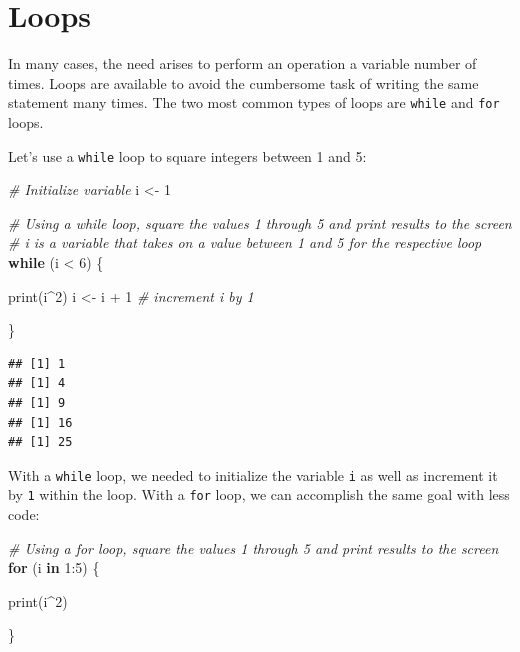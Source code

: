 \documentclass[
]{book}
\newenvironment{Shaded}{\begin{snugshade}}{\end{snugshade}}
\newcommand{\CommentTok}[1]{\textcolor[rgb]{0.56,0.35,0.01}{\textit{#1}}}
\newcommand{\ControlFlowTok}[1]{\textcolor[rgb]{0.13,0.29,0.53}{\textbf{#1}}}
\newcommand{\DecValTok}[1]{\textcolor[rgb]{0.00,0.00,0.81}{#1}}
\newcommand{\FunctionTok}[1]{\textcolor[rgb]{0.00,0.00,0.00}{#1}}
\newcommand{\NormalTok}[1]{#1}
\newcommand{\OtherTok}[1]{\textcolor[rgb]{0.56,0.35,0.01}{#1}}
\newcommand{\SpecialCharTok}[1]{\textcolor[rgb]{0.00,0.00,0.00}{#1}}
\begin{document}
\hypertarget{loops}{%
\section{Loops}\label{loops}}

In many cases, the need arises to perform an operation a variable number of times. Loops are available to avoid the cumbersome task of writing the same statement many times. The two most common types of loops are \texttt{while} and \texttt{for} loops.

Let's use a \texttt{while} loop to square integers between 1 and 5:

\begin{Shaded}
\begin{Highlighting}[]
\CommentTok{\# Initialize variable}
\NormalTok{i }\OtherTok{\textless{}{-}} \DecValTok{1}

\CommentTok{\# Using a \textquotesingle{}while\textquotesingle{} loop, square the values 1 through 5 and print results to the screen}
\CommentTok{\# \textquotesingle{}i\textquotesingle{} is a variable that takes on a value between 1 and 5 for the respective loop}
\ControlFlowTok{while}\NormalTok{ (i }\SpecialCharTok{\textless{}} \DecValTok{6}\NormalTok{) \{}
  
  \FunctionTok{print}\NormalTok{(i}\SpecialCharTok{\^{}}\DecValTok{2}\NormalTok{) }
\NormalTok{  i }\OtherTok{\textless{}{-}}\NormalTok{ i }\SpecialCharTok{+} \DecValTok{1} \CommentTok{\# increment i by 1}
  
\NormalTok{\}}
\end{Highlighting}
\end{Shaded}

\begin{verbatim}
## [1] 1
## [1] 4
## [1] 9
## [1] 16
## [1] 25
\end{verbatim}

With a \texttt{while} loop, we needed to initialize the variable \texttt{i} as well as increment it by \texttt{1} within the loop. With a \texttt{for} loop, we can accomplish the same goal with less code:

\begin{Shaded}
\begin{Highlighting}[]
\CommentTok{\# Using a \textquotesingle{}for\textquotesingle{} loop, square the values 1 through 5 and print results to the screen}
\ControlFlowTok{for}\NormalTok{ (i }\ControlFlowTok{in} \DecValTok{1}\SpecialCharTok{:}\DecValTok{5}\NormalTok{) \{ }
  
  \FunctionTok{print}\NormalTok{(i}\SpecialCharTok{\^{}}\DecValTok{2}\NormalTok{)}
  
\NormalTok{\}}
\end{Highlighting}
\end{Shaded}
\end{document}
